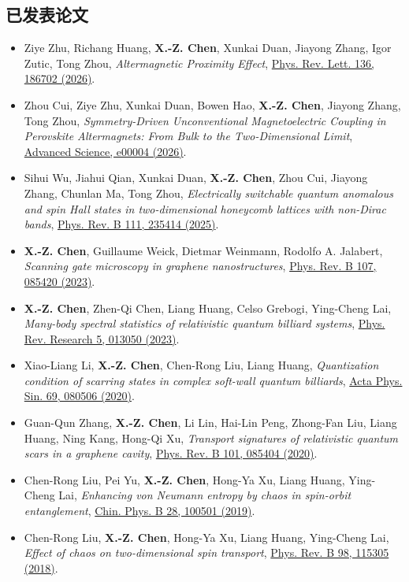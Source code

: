 \documentclass[11pt,a4paper]{article}
\begin{document}
\subsection*{已发表论文}
\begin{itemize}[leftmargin=1.8em,label={},itemsep=0.55em,topsep=0.3em]
\item[\textbf{[9]}] Ziye Zhu, Richang Huang, \textbf{X.-Z. Chen}, Xunkai Duan, Jiayong Zhang, Igor Zutic, Tong Zhou, \textit{Altermagnetic Proximity Effect}, \href{https://doi.org/10.1103/kqy8-myz1}{Phys. Rev. Lett. 136, 186702 (2026)}.
\item[\textbf{[8]}] Zhou Cui, Ziye Zhu, Xunkai Duan, Bowen Hao, \textbf{X.-Z. Chen}, Jiayong Zhang, Tong Zhou, \textit{Symmetry-Driven Unconventional Magnetoelectric Coupling in Perovskite Altermagnets: From Bulk to the Two-Dimensional Limit}, \href{https://doi.org/10.1002/advs.202600004}{Advanced Science, e00004 (2026)}.
\item[\textbf{[7]}] Sihui Wu, Jiahui Qian, Xunkai Duan, \textbf{X.-Z. Chen}, Zhou Cui, Jiayong Zhang, Chunlan Ma, Tong Zhou, \textit{Electrically switchable quantum anomalous and spin Hall states in two-dimensional honeycomb lattices with non-Dirac bands}, \href{https://doi.org/10.1103/PhysRevB.111.235414}{Phys. Rev. B 111, 235414 (2025)}.
\item[\textbf{[6]}] \textbf{X.-Z. Chen}, Guillaume Weick, Dietmar Weinmann, Rodolfo A. Jalabert, \textit{Scanning gate microscopy in graphene nanostructures}, \href{https://doi.org/10.1103/PhysRevB.107.085420}{Phys. Rev. B 107, 085420 (2023)}.
\item[\textbf{[5]}] \textbf{X.-Z. Chen}, Zhen-Qi Chen, Liang Huang, Celso Grebogi, Ying-Cheng Lai, \textit{Many-body spectral statistics of relativistic quantum billiard systems}, \href{https://doi.org/10.1103/PhysRevResearch.5.013050}{Phys. Rev. Research 5, 013050 (2023)}.
\item[\textbf{[4]}] Xiao-Liang Li, \textbf{X.-Z. Chen}, Chen-Rong Liu, Liang Huang, \textit{Quantization condition of scarring states in complex soft-wall quantum billiards}, \href{https://doi.org/10.7498/aps.69.20200360}{Acta Phys. Sin. 69, 080506 (2020)}.
\item[\textbf{[3]}] Guan-Qun Zhang, \textbf{X.-Z. Chen}, Li Lin, Hai-Lin Peng, Zhong-Fan Liu, Liang Huang, Ning Kang, Hong-Qi Xu, \textit{Transport signatures of relativistic quantum scars in a graphene cavity}, \href{https://doi.org/10.1103/PhysRevB.101.085404}{Phys. Rev. B 101, 085404 (2020)}.
\item[\textbf{[2]}] Chen-Rong Liu, Pei Yu, \textbf{X.-Z. Chen}, Hong-Ya Xu, Liang Huang, Ying-Cheng Lai, \textit{Enhancing von Neumann entropy by chaos in spin-orbit entanglement}, \href{https://doi.org/10.1088/1674-1056/ab3dff}{Chin. Phys. B 28, 100501 (2019)}.
\item[\textbf{[1]}] Chen-Rong Liu, \textbf{X.-Z. Chen}, Hong-Ya Xu, Liang Huang, Ying-Cheng Lai, \textit{Effect of chaos on two-dimensional spin transport}, \href{https://doi.org/10.1103/PhysRevB.98.115305}{Phys. Rev. B 98, 115305 (2018)}.
\end{itemize}
\end{document}

